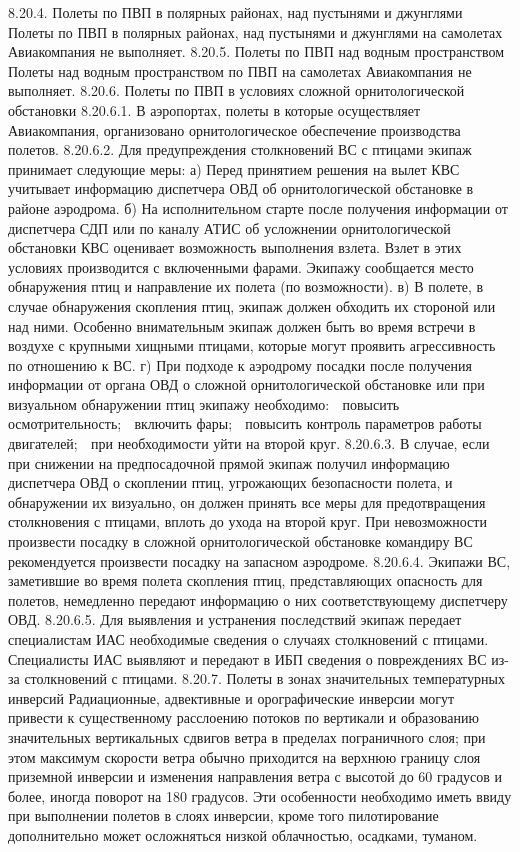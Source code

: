 8.20.4.	Полеты по ПВП в полярных районах, над пустынями и джунглями
Полеты по ПВП в полярных районах, над пустынями и джунглями на самолетах Авиакомпания не выполняет.
8.20.5.	Полеты по ПВП над водным пространством
Полеты над водным пространством по ПВП на самолетах Авиакомпания не выполняет.
8.20.6.	Полеты по ПВП в условиях сложной орнитологической обстановки
8.20.6.1. В аэропортах, полеты в которые осуществляет Авиакомпания, организовано орнитологическое обеспечение производства полетов.
8.20.6.2. Для предупреждения столкновений ВС с птицами экипаж принимает следующие меры:
а)	Перед принятием решения на вылет КВС учитывает информацию диспетчера ОВД об орнитологической обстановке в районе аэродрома.
б)	На исполнительном старте после получения информации от диспетчера СДП или по каналу АТИС об усложнении орнитологической обстановки КВС оценивает возможность выполнения взлета. Взлет в этих условиях производится с включенными фарами. Экипажу сообщается место обнаружения птиц и направление их полета (по возможности).
в)	В полете, в случае обнаружения скопления птиц, экипаж должен обходить их стороной или над ними. Особенно внимательным экипаж должен быть во время встречи в воздухе с крупными хищными птицами, которые могут проявить агрессивность по отношению к ВС.
г)	При подходе к аэродрому посадки после получения информации от органа ОВД о сложной орнитологической обстановке или при визуальном обнаружении птиц экипажу необходимо:
	повысить осмотрительность;
	включить фары;
	повысить контроль параметров работы двигателей;
	при необходимости уйти на второй круг.
8.20.6.3. В случае, если при снижении на предпосадочной прямой экипаж получил информацию диспетчера ОВД о скоплении птиц, угрожающих безопасности полета, и обнаружении их визуально, он должен принять все меры для предотвращения столкновения с птицами, вплоть до ухода на второй круг.
При невозможности произвести посадку в сложной орнитологической обстановке командиру ВС рекомендуется произвести посадку на запасном аэродроме.
8.20.6.4. Экипажи ВС, заметившие во время полета скопления птиц, представляющих опасность для полетов, немедленно передают информацию о них соответствующему диспетчеру ОВД.
8.20.6.5. Для выявления и устранения последствий экипаж передает специалистам ИАС необходимые сведения о случаях столкновений с птицами.
Специалисты ИАС выявляют и передают в ИБП сведения о повреждениях ВС из-за столкновений с птицами.
8.20.7.	Полеты в зонах значительных температурных инверсий
Радиационные, адвективные и орографические инверсии могут привести к существенному расслоению потоков по вертикали и образованию значительных вертикальных сдвигов ветра в пределах пограничного слоя; при этом максимум скорости ветра обычно приходится на верхнюю границу слоя приземной инверсии и изменения направления ветра с высотой до 60 градусов и более, иногда поворот на 180 градусов. Эти особенности необходимо иметь ввиду при выполнении полетов в слоях инверсии, кроме того пилотирование дополнительно может осложняться низкой облачностью, осадками, туманом.
